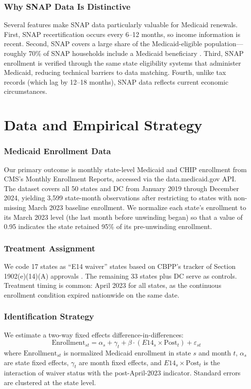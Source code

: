 \documentclass[12pt]{article}
\begin{document}
\subsubsection*{Why SNAP Data Is Distinctive} Several features make SNAP data particularly valuable for Medicaid renewals. First, SNAP recertification occurs every 6--12 months, so income information is recent. Second, SNAP covers a large share of the Medicaid-eligible population---roughly 70\% of SNAP households include a Medicaid beneficiary \citep{ganong2018people}. Third, SNAP enrollment is verified through the same state eligibility systems that administer Medicaid, reducing technical barriers to data matching. Fourth, unlike tax records (which lag by 12--18 months), SNAP data reflects current economic circumstances.

\section{Data and Empirical Strategy}

\subsubsection*{Medicaid Enrollment Data} Our primary outcome is monthly state-level Medicaid and CHIP enrollment from CMS's Monthly Enrollment Reports, accessed via the data.medicaid.gov API. The dataset covers all 50 states and DC from January 2019 through December 2024, yielding 3,599 state-month observations after restricting to states with non-missing March 2023 baseline enrollment. We normalize each state's enrollment to its March 2023 level (the last month before unwinding began) so that a value of 0.95 indicates the state retained 95\% of its pre-unwinding enrollment.

\subsubsection*{Treatment Assignment} We code 17 states as ``E14 waiver'' states based on CBPP's tracker of Section 1902(e)(14)(A) approvals \citep{cbpp2024renewals}. The remaining 33 states plus DC serve as controls. Treatment timing is common: April 2023 for all states, as the continuous enrollment condition expired nationwide on the same date.

\subsubsection*{Identification Strategy} We estimate a two-way fixed effects difference-in-differences:
\begin{equation}
\text{Enrollment}_{st} = \alpha_s + \gamma_t + \beta \cdot (E14_s \times \text{Post}_t) + \varepsilon_{st}
\end{equation}
where $\text{Enrollment}_{st}$ is normalized Medicaid enrollment in state $s$ and month $t$, $\alpha_s$ are state fixed effects, $\gamma_t$ are month fixed effects, and $E14_s \times \text{Post}_t$ is the interaction of waiver status with the post-April-2023 indicator. Standard errors are clustered at the state level.
\end{document}
